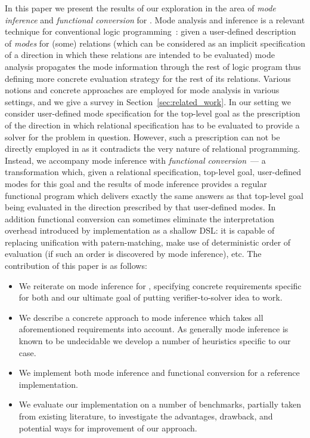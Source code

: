 In this paper we present the results of our exploration in the area of \emph{mode inference} and \emph{functional conversion} for \mk.
Mode analysis and inference is a relevant technique for conventional logic programming~\cite{mercury et al}: given a user-defined
description of \emph{modes} for (some) relations (which can be considered as an implicit specification of a direction in which
these relations are intended to be evaluated) mode analysis propagates the mode information through the rest of logic program thus
defining more concrete evaluation strategy for the rest of its relations. Various notions and concrete approaches are employed
for mode analysis in various settings, and we give a survey in Section~\ref{sec:related_work}. In our setting we consider user-defined
mode specification for the top-level goal as the prescription of the direction in which relational specification has to
be evaluated to provide a solver for the problem in question. However, such a prescription can not be directly employed in \mk as it
contradicts the very nature of relational programming. Instead, we accompany mode inference with \emph{functional conversion}~---
a transformation which, given a relational specification, top-level goal, user-defined modes for this goal and the results of mode
inference provides a regular functional program which delivers exactly the same answers as that top-level goal being evaluated
in the direction prescribed by that user-defined modes. In addition functional conversion can sometimes eliminate the
interpretation overhead introduced by \mk implementation as a shallow DSL: it is capable of replacing unification with
patern-matching, make use of deterministic order of evaluation (if such an order is discovered by mode inference), etc.
The contribution of this paper is as follows:

\begin{itemize}
\item We reiterate on mode inference for \mk, specifying concrete requirements
  specific for both \mk and our ultimate goal of putting verifier-to-solver
  idea to work.
\item We describe a concrete approach to mode inference which takes all aforementioned
  requirements into account. As generally mode inference is known to be undecidable we
  develop a number of heuristics specific to our case.
\item We implement both mode inference and functional conversion for a reference
  \mk implementation.
\item We evaluate our implementation on a number of benchmarks, partially
  taken from existing literature, to investigate the advantages, drawback, and
  potential ways for improvement of our approach.
\end{itemize}

